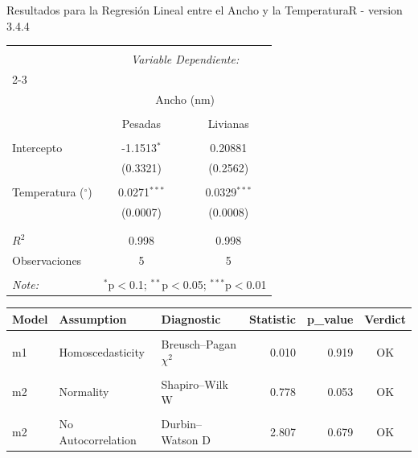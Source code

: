 \documentclass[12pt,a4paper]{config/myConfig}
\newcommand{\Rcode}{R - version 3.4.4}
\begin{document}
\begin{TableLab}{Resultados para la Regresión Lineal entre el Ancho y la Temperatura}{\Rcode}{}
\begin{tabular}{@{\extracolsep{5pt}}lcc} 
\\[-1.8ex]\hline 
\hline \\[-1.8ex] 
 & \multicolumn{2}{c}{\textit{Variable Dependiente:}} \\ 
\cline{2-3} 
\\[-1.8ex] & \multicolumn{2}{c}{Ancho (nm)} \\ 
\\[-1.8ex] & Pesadas & Livianas\\ 
\hline \\[-1.8ex] 
 Intercepto & -1.1513$^{*}$ & 0.20881 \\ 
  & (0.3321) & (0.2562) \\ 
  & & \\ 
 Temperatura ($^{\circ}$) & 0.0271$^{***}$ & 0.0329$^{***}$ \\ 
  & (0.0007) & (0.0008) \\ 
  & & \\ 
\hline \\[-1.8ex] 
$R^2$ & 0.998 & 0.998 \\ 
Observaciones & 5 & 5 \\  
\hline 
\hline \\[-1.8ex] 
\textit{Note:}  & \multicolumn{2}{r}{$^{*}$p$<$0.1; $^{**}$p$<$0.05; $^{***}$p$<$0.01} \\ 
\end{tabular} 
\begin{tabular}[t]{lllrrc}
\toprule
Model & Assumption & Diagnostic & Statistic & p\_value & Verdict\\
\midrule
\cellcolor{gray!10}{m1} & \cellcolor{gray!10}{Normality} & \cellcolor{gray!10}{Shapiro–Wilk W} & \cellcolor{gray!10}{0.857} & \cellcolor{gray!10}{0.219} & \cellcolor{gray!10}{OK}\\
m1 & Homoscedasticity & Breusch–Pagan $\chi^2$ & 0.010 & 0.919 & OK\\
\cellcolor{gray!10}{m1} & \cellcolor{gray!10}{No Autocorrelation} & \cellcolor{gray!10}{Durbin–Watson D} & \cellcolor{gray!10}{1.818} & \cellcolor{gray!10}{0.149} & \cellcolor{gray!10}{OK}\\
m2 & Normality & Shapiro–Wilk W & 0.778 & 0.053 & OK\\
\cellcolor{gray!10}{m2} & \cellcolor{gray!10}{Homoscedasticity} & \cellcolor{gray!10}{Breusch–Pagan X2} & \cellcolor{gray!10}{0.760} & \cellcolor{gray!10}{0.383} & \cellcolor{gray!10}{OK}\\
\addlinespace
m2 & No Autocorrelation & Durbin–Watson D & 2.807 & 0.679 & OK\\
\bottomrule
\end{tabular}
\end{TableLab}
\end{document}
